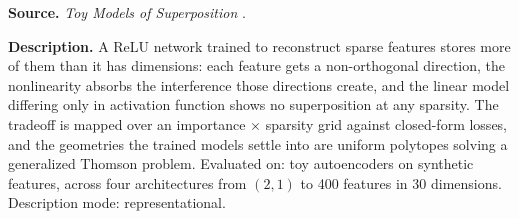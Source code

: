
\textbf{Source.} \emph{Toy Models of Superposition} \citep{elhage2022superposition}.

\textbf{Description.} A ReLU network trained to reconstruct sparse features stores more of them than it has dimensions: each feature gets a non-orthogonal direction, the nonlinearity absorbs the interference those directions create, and the linear model differing only in activation function shows no superposition at any sparsity. The tradeoff is mapped over an importance $\times$ sparsity grid against closed-form losses, and the geometries the trained models settle into are uniform polytopes solving a generalized Thomson problem. Evaluated on: toy autoencoders on synthetic features, across four architectures from $(2,1)$ to 400 features in 30 dimensions. Description mode: representational.

